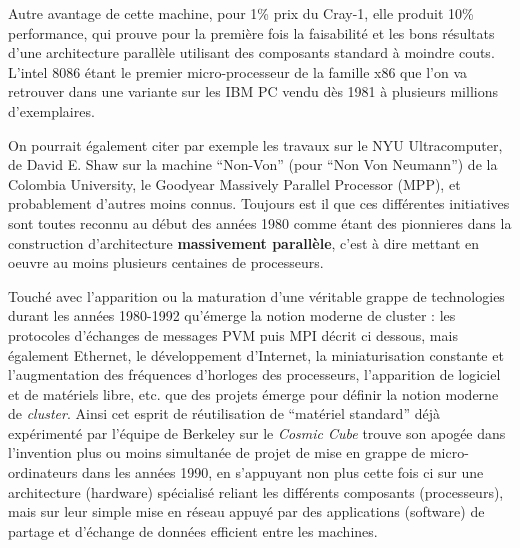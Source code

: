 Autre avantage de cette machine, pour 1\% prix du Cray-1, elle produit 10\% performance, qui prouve pour la première fois la faisabilité et les bons résultats d'une architecture parallèle utilisant des composants standard à moindre couts. L'intel 8086 étant le premier micro-processeur de la famille x86 que l'on va retrouver dans une variante sur les IBM PC vendu dès 1981 à plusieurs millions d'exemplaires. %

On pourrait également citer par exemple les travaux sur le NYU Ultracomputer, de David E. Shaw sur la machine “Non-Von” (pour “Non Von Neumann”) de la Colombia University, le Goodyear Massively Parallel Processor (MPP), et probablement d'autres moins connus. Toujours est il que ces différentes initiatives sont toutes reconnu au début des années 1980 comme étant des pionnieres dans la construction d’architecture \textbf{massivement parallèle}, c'est à dire mettant en oeuvre au moins plusieurs centaines de processeurs.

Touché avec l'apparition ou la maturation d'une véritable grappe de technologies durant les années 1980-1992 qu'émerge la notion moderne de cluster : les protocoles d'échanges de messages PVM puis MPI décrit ci dessous, mais également Ethernet, le développement d'Internet, la miniaturisation constante et l'augmentation des fréquences d'horloges des processeurs, l'apparition de logiciel et de matériels libre, etc. que des projets émerge pour définir la notion moderne de \textit{cluster}.  Ainsi cet esprit de réutilisation de \enquote{matériel standard} déjà expérimenté par l'équipe de Berkeley sur le \textit{Cosmic Cube} trouve son apogée dans l'invention plus ou moins simultanée de projet de mise en grappe de micro-ordinateurs dans les années 1990, en s'appuyant non plus cette fois ci sur une architecture (hardware) spécialisé reliant les différents composants (processeurs), mais sur leur simple mise en réseau appuyé par des applications (software) de partage et d'échange de données efficient entre les machines.


